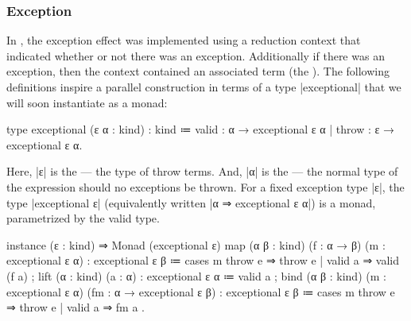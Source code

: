 \subsubsection{Exception}

In \LangB, the exception effect was implemented using a reduction context that indicated whether or not there was an exception.
Additionally if there was an exception, then the context contained an associated term (the ).
The following definitions inspire a parallel construction in terms of a type \code|exceptional| that we will soon instantiate as a monad:
\begin{program}[caption={Definition of \code|exceptional|}, label={lst:def-exceptional}]
type exceptional (ε α : kind) : kind
  ≔ valid : α → exceptional ε α
  | throw : ε → exceptional ε α.
\end{program}
Here, \code|ε| is the  --- the type of throw terms.
And, \code|α| is the  ---  the normal type of the expression should no exceptions be thrown.
For a fixed exception type \code|ε|, the type \code|exceptional ε| (equivalently written \code|α ⇒ exceptional ε α|) is a monad, parametrized by the valid type.

\newpage
\begin{program}[caption={Instance of the exception monad}, label={lst:inst-exception-monad}]
instance (ε : kind) ⇒ Monad (exceptional ε)
  { map (α β : kind)
      (f : α → β) (m : exceptional ε α)
      : exceptional ε β
      ≔ cases m
          { throw e ⇒ throw e
          | valid a ⇒ valid (f a) }
  ; lift (α : kind)
      (a : α)
      : exceptional ε α
      ≔ valid a
  ; bind (α β : kind)
      (m : exceptional ε α) (fm : α → exceptional ε β)
      : exceptional ε β
      ≔ cases m
          { throw e ⇒ throw e
          | valid a ⇒ fm a } }.
\end{program}

